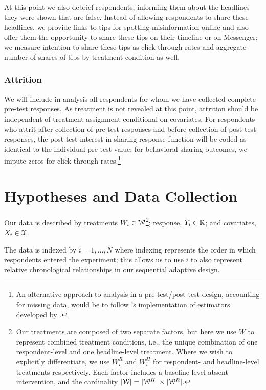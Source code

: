 \documentclass[letterpaper, 12pt, parskip=full,DIV=10]{scrartcl}
\begin{document}
At this point we also debrief respondents, informing them about the headlines they were shown that are false. Instead of allowing respondents to share these headlines, we provide links to tips for spotting misinformation online and also offer them the opportunity to share these tips on their timeline or on Messenger; we measure intention to share these tips as click-through-rates and aggregate number of shares of tips by treatment condition as well. 


\subsubsection{Attrition} We will include in analysis all respondents for whom we have collected complete pre-test responses. As treatment is not revealed at this point, attrition should be independent of treatment assignment conditional on covariates. For respondents who attrit after collection of pre-test responses and before collection of post-test responses, the post-test interest in sharing response function will be coded as identical to the individual pre-test value; for behavioral sharing outcomes, we impute zeros for click-through-rates.\footnote{An alternative approach to analysis in a pre-test/post-test design, accounting for missing data, would be to follow \cite{davidian2005semiparametric}'s implementation of estimators developed by \cite{robins1994estimation}.}


\section{Hypotheses and Data Collection}



Our data is described by treatments $W_i \in {\EuScript W}$\footnote{Our treatments are composed of two separate factors, but here we use $W$ to represent combined treatment conditions, i.e., the unique combination of one respondent-level and one headline-level treatment. Where we wish to explicitly differentiate, we use $W^R_i$ and $W^H_i$ for respondent- and headline-level treatments respectively. Each factor includes a baseline level absent intervention, and the cardinality $|{\EuScript W}| = |{\EuScript W}^H|\times |{\EuScript W}^R|$.}; response,  $Y_i \in {\mathbb R}$; and covariates, $X_i \in {\EuScript X}$. 

The data is indexed by $i = 1, \dots, N$ where indexing represents the order in which respondents entered the experiment; this allows us to use $i$ to also represent relative chronological relationships in our sequential adaptive design. 
\end{document}
